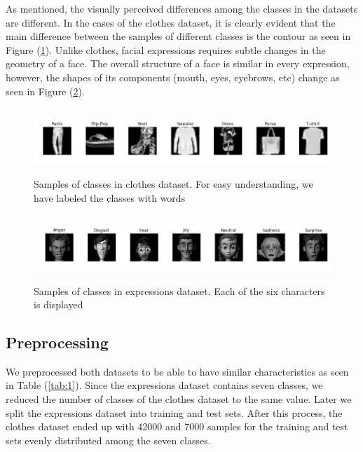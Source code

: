\documentclass{article}
\begin{document}
As mentioned, the visually perceived differences among the classes in the datasets are different. In the cases of the clothes dataset, it is clearly evident that the main difference between the samples of different classes is the contour as seen in Figure (\ref{fig:1}). Unlike clothes, facial expressions requires subtle changes in the geometry of a face. The overall structure of a face is similar in every expression, however, the shapes of its components (mouth, eyes, eyebrows, etc) change as seen in Figure (\ref{fig:2}).
\begin{figure}[tb]
	\vskip 5mm
		\begin{center}
			\includegraphics[width=\textwidth,height=2.5cm]{original_clothes}
			\caption{Samples of classes in clothes dataset. For easy understanding, we have labeled the classes with words}
			\label{fig:1}
		\end{center}
	\vskip -5mm
\end{figure}

\begin{figure}[tb]
	\vskip 5mm
		\begin{center}
			\includegraphics[width=\textwidth,height=2.5cm]{original_expressions}
			\caption{Samples of classes in expressions dataset. Each of the six characters is displayed}
			\label{fig:2}
		\end{center}
	\vskip -5mm
\end{figure}

\subsection{Preprocessing}
\label{sec:preprocessing}
We preprocessed both datasets to be able to have similar characteristics as seen in Table (\ref{tab:1}). Since the expressions dataset contains seven classes, we reduced the number of classes of the clothes dataset to the same value. Later we split the expressions dataset into training and test sets. After this process, the clothes dataset ended up with 42000 and 7000 samples for the training and test sets evenly distributed among the seven classes. 
\end{document}
